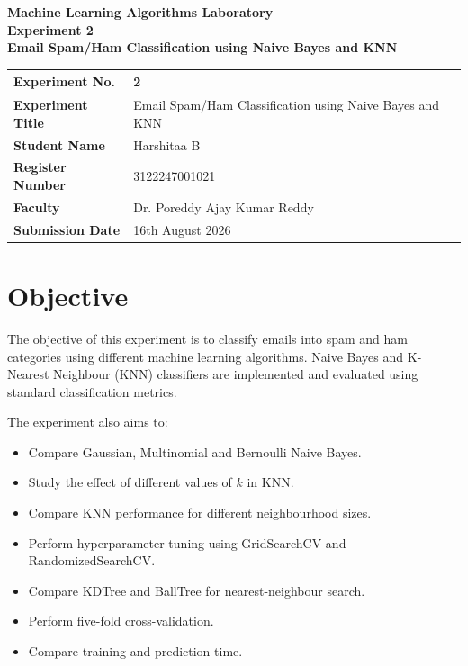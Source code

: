 \documentclass[12pt,a4paper]{article}
\begin{document}

\begin{center}
    {\Large\textbf{Machine Learning Algorithms Laboratory}}\\[0.3cm]
    {\large\textbf{Experiment 2}}\\[0.2cm]
    {\Large\textbf{Email Spam/Ham Classification using Naive Bayes and KNN}}
\end{center}

\vspace{0.5cm}

\begin{tabular}{|p{4cm}|p{10.5cm}|}
\hline
\textbf{Experiment No.} & 2 \\ \hline

\textbf{Experiment Title} &
Email Spam/Ham Classification using Naive Bayes and KNN \\ \hline

\textbf{Student Name} &
Harshitaa B \\ \hline

\textbf{Register Number} &
3122247001021 \\ \hline

\textbf{Faculty} &
Dr. Poreddy Ajay Kumar Reddy \\ \hline

\textbf{Submission Date} &
16th August 2026 \\ \hline

\end{tabular}


\section{Objective}

The objective of this experiment is to classify emails into spam and ham categories using different machine learning algorithms. Naive Bayes and K-Nearest Neighbour (KNN) classifiers are implemented and evaluated using standard classification metrics.

The experiment also aims to:

\begin{itemize}
    \item Compare Gaussian, Multinomial and Bernoulli Naive Bayes.
    \item Study the effect of different values of $k$ in KNN.
    \item Compare KNN performance for different neighbourhood sizes.
    \item Perform hyperparameter tuning using GridSearchCV and RandomizedSearchCV.
    \item Compare KDTree and BallTree for nearest-neighbour search.
    \item Perform five-fold cross-validation.
    \item Compare training and prediction time.
\end{itemize}
\end{document}
